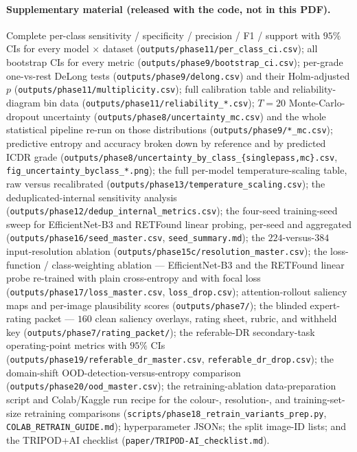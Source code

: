 \documentclass[journal]{IEEEtran}
\begin{document}
\paragraph{Supplementary material (released with the code, not in this PDF).}
Complete per-class sensitivity / specificity / precision / F1 / support with
$95\%$ CIs for every model $\times$ dataset
(\texttt{outputs/phase11/per\_class\_ci.csv}); all bootstrap CIs for every metric
(\texttt{outputs/phase9/bootstrap\_ci.csv}); per-grade one-vs-rest DeLong tests
(\texttt{outputs/phase9/delong.csv}) and their Holm-adjusted $p$
(\texttt{outputs/phase11/multiplicity.csv}); full calibration table and
reliability-diagram bin data (\texttt{outputs/phase11/reliability\_*.csv});
$T=20$ Monte-Carlo-dropout uncertainty
(\texttt{outputs/phase8/uncertainty\_mc.csv}) and the whole statistical pipeline
re-run on those distributions (\texttt{outputs/phase9/*\_mc.csv}); predictive
entropy and accuracy broken down by reference and by predicted ICDR grade
(\texttt{outputs/phase8/uncertainty\_by\_class\_\{singlepass,mc\}.csv},
\texttt{fig\_uncertainty\_byclass\_*.png}); the full per-model
temperature-scaling table, raw versus recalibrated
(\texttt{outputs/phase13/temperature\_scaling.csv}); the deduplicated-internal
sensitivity analysis (\texttt{outputs/phase12/dedup\_internal\_metrics.csv});
the four-seed training-seed sweep for EfficientNet-B3 and RETFound linear
probing, per-seed and aggregated (\texttt{outputs/phase16/seed\_master.csv},
\texttt{seed\_summary.md}); the $224$-versus-$384$ input-resolution ablation
(\texttt{outputs/phase15c/resolution\_master.csv}); the loss-function /
class-weighting ablation --- EfficientNet-B3 and the RETFound linear probe
re-trained with plain cross-entropy and with focal loss
(\texttt{outputs/phase17/loss\_master.csv}, \texttt{loss\_drop.csv});
attention-rollout saliency maps and per-image plausibility scores
(\texttt{outputs/phase7/}); the blinded expert-rating packet --- $160$ clean
saliency overlays, rating sheet, rubric, and withheld key
(\texttt{outputs/phase7/rating\_packet/}); the referable-DR secondary-task
operating-point metrics with $95\%$ CIs
(\texttt{outputs/phase19/referable\_dr\_master.csv},
\texttt{referable\_dr\_drop.csv}); the domain-shift OOD-detection-versus-entropy
comparison (\texttt{outputs/phase20/ood\_master.csv}); the retraining-ablation
data-preparation script and Colab/Kaggle run recipe for the colour-,
resolution-, and training-set-size retraining comparisons
(\texttt{scripts/phase18\_retrain\_variants\_prep.py},
\texttt{COLAB\_RETRAIN\_GUIDE.md}); hyperparameter JSONs; the split image-ID
lists; and the TRIPOD+AI checklist (\texttt{paper/TRIPOD-AI\_checklist.md}).
\end{document}
